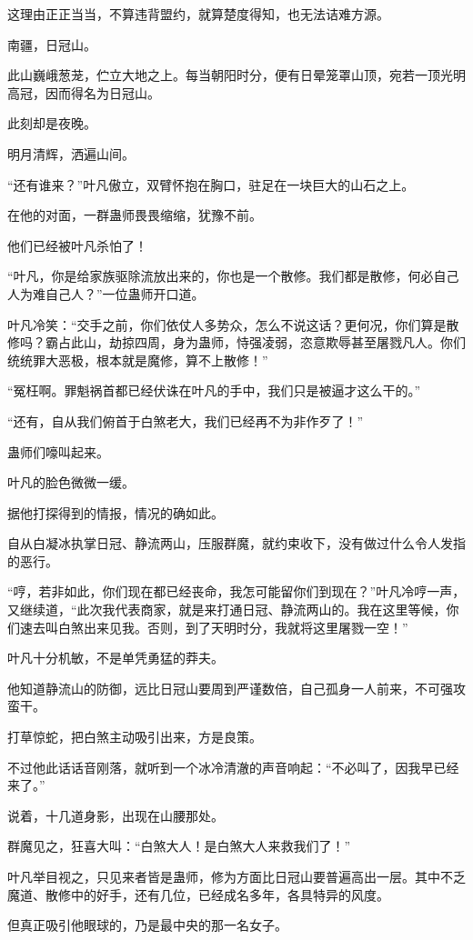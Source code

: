 \begin{this_body}
这理由正正当当，不算违背盟约，就算楚度得知，也无法诘难方源。

南疆，日冠山。

此山巍峨葱茏，伫立大地之上。每当朝阳时分，便有日晕笼罩山顶，宛若一顶光明高冠，因而得名为日冠山。

此刻却是夜晚。

明月清辉，洒遍山间。

“还有谁来？”叶凡傲立，双臂怀抱在胸口，驻足在一块巨大的山石之上。

在他的对面，一群蛊师畏畏缩缩，犹豫不前。

他们已经被叶凡杀怕了！

“叶凡，你是给家族驱除流放出来的，你也是一个散修。我们都是散修，何必自己人为难自己人？”一位蛊师开口道。

叶凡冷笑：“交手之前，你们依仗人多势众，怎么不说这话？更何况，你们算是散修吗？霸占此山，劫掠四周，身为蛊师，恃强凌弱，恣意欺辱甚至屠戮凡人。你们统统罪大恶极，根本就是魔修，算不上散修！”

“冤枉啊。罪魁祸首都已经伏诛在叶凡的手中，我们只是被逼才这么干的。”

“还有，自从我们俯首于白煞老大，我们已经再不为非作歹了！”

蛊师们嚎叫起来。

叶凡的脸色微微一缓。

据他打探得到的情报，情况的确如此。

自从白凝冰执掌日冠、静流两山，压服群魔，就约束收下，没有做过什么令人发指的恶行。

“哼，若非如此，你们现在都已经丧命，我怎可能留你们到现在？”叶凡冷哼一声，又继续道，“此次我代表商家，就是来打通日冠、静流两山的。我在这里等候，你们速去叫白煞出来见我。否则，到了天明时分，我就将这里屠戮一空！”

叶凡十分机敏，不是单凭勇猛的莽夫。

他知道静流山的防御，远比日冠山要周到严谨数倍，自己孤身一人前来，不可强攻蛮干。

打草惊蛇，把白煞主动吸引出来，方是良策。

不过他此话话音刚落，就听到一个冰冷清澈的声音响起：“不必叫了，因我早已经来了。”

说着，十几道身影，出现在山腰那处。

群魔见之，狂喜大叫：“白煞大人！是白煞大人来救我们了！”

叶凡举目视之，只见来者皆是蛊师，修为方面比日冠山要普遍高出一层。其中不乏魔道、散修中的好手，还有几位，已经成名多年，各具特异的风度。

但真正吸引他眼球的，乃是最中央的那一名女子。


\end{this_body}
